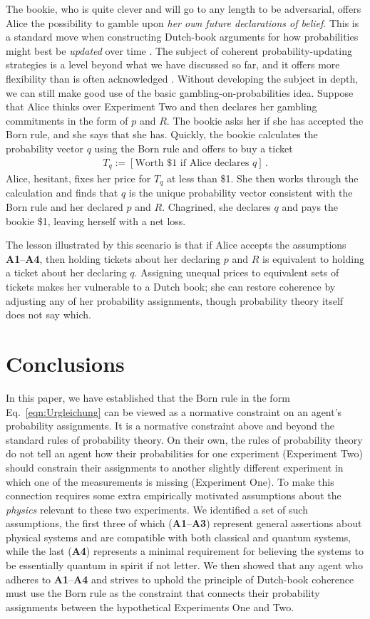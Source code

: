 \documentclass[%
 reprint,superscriptaddress,
 amsmath,amssymb,
 aps,pra, onecolumn, 12pt
]{revtex4-2}
\newcommand{\eqn}[1]{\begin{eqnarray} #1 \end{eqnarray}}
\newcommand{\tit}[1]{\textit{#1}}
\newcommand{\trm}[1]{\textrm{#1}}
\newcommand{\onestage}{{One}}
\newcommand{\twostage}{{Two}}
\begin{document}
The bookie, who is quite clever and will go to any length to be adversarial, offers Alice the possibility to gamble upon \tit{her own future declarations of belief}. This is a standard move when constructing Dutch-book arguments for how probabilities might best be \tit{updated} over time \cite{VANF, FS_reflection}. The subject of coherent probability-updating strategies is a level beyond what we have discussed so far, and it offers more flexibility than is often acknowledged \cite{FS_reflection}. Without developing the subject in depth, we can still make good use of the basic gambling-on-probabilities idea. Suppose that Alice thinks over Experiment \twostage{} and then declares her gambling commitments in the form of $p$ and $R$. The bookie asks her if she has accepted the Born rule, and she says that she has. Quickly, the bookie calculates the probability vector $q$ using the Born rule and offers to buy a ticket
\eqn{
  T_q := [ \trm{Worth \$1 if Alice declares $q$} ] \, .
}
Alice, hesitant, fixes her price for $T_q$ at less than \$1. She then works through the calculation and finds that $q$ is the unique probability vector consistent with the Born rule and her declared $p$ and $R$. Chagrined, she declares $q$ and pays the bookie \$1, leaving herself with a net loss.

The lesson illustrated by this scenario is that if Alice accepts the assumptions {\bf A1}--{\bf A4}, then holding tickets about her declaring $p$ and $R$ is equivalent to holding a ticket about her declaring $q$. Assigning unequal prices to equivalent sets of tickets makes her vulnerable to a Dutch book; she can restore coherence by adjusting any of her probability assignments, though probability theory itself does not say which.

\section{Conclusions}

In this paper, we have established that the Born rule in the form Eq.\ \eqref{eqn:Urgleichung} can be viewed as a normative constraint on an agent's probability assignments. It is a normative constraint above and beyond the standard rules of probability theory. On their own, the rules of probability theory do not tell an agent how their probabilities for one experiment (Experiment \twostage) should constrain their assignments to another slightly different experiment in which one of the measurements is missing (Experiment \onestage). To make this connection requires some extra empirically motivated assumptions about the \tit{physics} relevant to these two experiments. We identified a set of such assumptions, the first three of which ({\bf A1}--{\bf A3}) represent general assertions about physical systems and are compatible with both classical and quantum systems, while the last ({\bf A4}) represents a minimal requirement for believing the systems to be essentially quantum in spirit if not letter. We then showed that any agent who adheres to {\bf A1}--{\bf A4} and strives to uphold the principle of Dutch-book coherence must use the Born rule as the constraint that connects their probability assignments between the hypothetical Experiments \onestage{} and \twostage.
\end{document}
